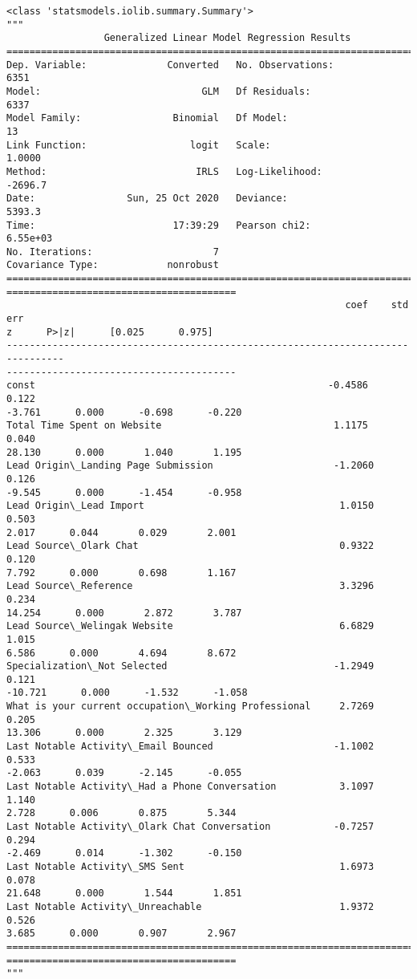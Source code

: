 \documentclass[11pt]{article}
\makeatletter
\newcommand{\boxspacing}{\kern\kvtcb@left@rule\kern\kvtcb@boxsep}
\newcommand{\prompt}[4]{
        \ttfamily\llap{{\color{#2}[#3]:\hspace{3pt}#4}}\vspace{-\baselineskip}
    }
\makeatother
\begin{document}
            \begin{tcolorbox}[breakable, size=fbox, boxrule=.5pt, pad at break*=1mm, opacityfill=0]
\prompt{Out}{outcolor}{81}{\boxspacing}
\begin{Verbatim}[commandchars=\\\{\}]
<class 'statsmodels.iolib.summary.Summary'>
"""
                 Generalized Linear Model Regression Results
==============================================================================
Dep. Variable:              Converted   No. Observations:                 6351
Model:                            GLM   Df Residuals:                     6337
Model Family:                Binomial   Df Model:                           13
Link Function:                  logit   Scale:                          1.0000
Method:                          IRLS   Log-Likelihood:                -2696.7
Date:                Sun, 25 Oct 2020   Deviance:                       5393.3
Time:                        17:39:29   Pearson chi2:                 6.55e+03
No. Iterations:                     7
Covariance Type:            nonrobust
================================================================================
========================================
                                                           coef    std err
z      P>|z|      [0.025      0.975]
--------------------------------------------------------------------------------
----------------------------------------
const                                                   -0.4586      0.122
-3.761      0.000      -0.698      -0.220
Total Time Spent on Website                              1.1175      0.040
28.130      0.000       1.040       1.195
Lead Origin\_Landing Page Submission                     -1.2060      0.126
-9.545      0.000      -1.454      -0.958
Lead Origin\_Lead Import                                  1.0150      0.503
2.017      0.044       0.029       2.001
Lead Source\_Olark Chat                                   0.9322      0.120
7.792      0.000       0.698       1.167
Lead Source\_Reference                                    3.3296      0.234
14.254      0.000       2.872       3.787
Lead Source\_Welingak Website                             6.6829      1.015
6.586      0.000       4.694       8.672
Specialization\_Not Selected                             -1.2949      0.121
-10.721      0.000      -1.532      -1.058
What is your current occupation\_Working Professional     2.7269      0.205
13.306      0.000       2.325       3.129
Last Notable Activity\_Email Bounced                     -1.1002      0.533
-2.063      0.039      -2.145      -0.055
Last Notable Activity\_Had a Phone Conversation           3.1097      1.140
2.728      0.006       0.875       5.344
Last Notable Activity\_Olark Chat Conversation           -0.7257      0.294
-2.469      0.014      -1.302      -0.150
Last Notable Activity\_SMS Sent                           1.6973      0.078
21.648      0.000       1.544       1.851
Last Notable Activity\_Unreachable                        1.9372      0.526
3.685      0.000       0.907       2.967
================================================================================
========================================
"""
\end{Verbatim}
\end{tcolorbox}
\end{document}
